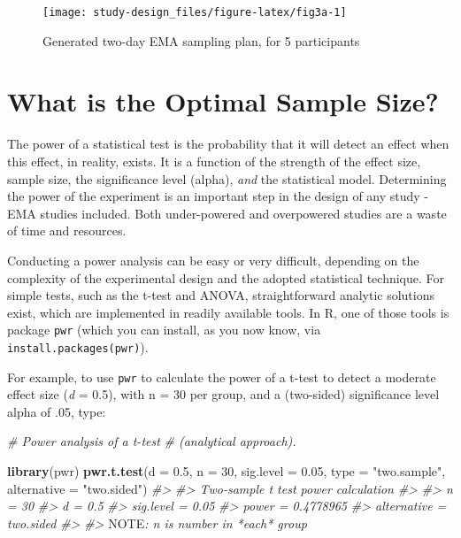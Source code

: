 \documentclass[]{book}
\newenvironment{Shaded}{\begin{snugshade}}{\end{snugshade}}
\newcommand{\KeywordTok}[1]{\textcolor[rgb]{0.13,0.29,0.53}{\textbf{#1}}}
\newcommand{\DataTypeTok}[1]{\textcolor[rgb]{0.13,0.29,0.53}{#1}}
\newcommand{\DecValTok}[1]{\textcolor[rgb]{0.00,0.00,0.81}{#1}}
\newcommand{\FloatTok}[1]{\textcolor[rgb]{0.00,0.00,0.81}{#1}}
\newcommand{\StringTok}[1]{\textcolor[rgb]{0.31,0.60,0.02}{#1}}
\newcommand{\CommentTok}[1]{\textcolor[rgb]{0.56,0.35,0.01}{\textit{#1}}}
\newcommand{\AlertTok}[1]{\textcolor[rgb]{0.94,0.16,0.16}{#1}}
\newcommand{\NormalTok}[1]{#1}
\begin{document}
\begin{figure}

{\centering \texttt{[image: study-design\_files/figure-latex/fig3a-1]} 

}

\caption{Generated two-day EMA sampling plan, for 5 participants}\label{fig:fig3a}
\end{figure}

\section{What is the Optimal Sample
Size?}\label{what-is-the-optimal-sample-size}


The power of a statistical test is the probability that it will detect
an effect when this effect, in reality, exists. It is a function of the
strength of the effect size, sample size, the significance level
(alpha), \emph{and} the statistical model. Determining the power of the
experiment is an important step in the design of any study - EMA studies
included. Both under-powered and overpowered studies are a waste of time
and resources.

Conducting a power analysis can be easy or very difficult, depending on
the complexity of the experimental design and the adopted statistical
technique. For simple tests, such as the t-test and ANOVA,
straightforward analytic solutions exist, which are implemented in
readily available tools. In R, one of those tools is package
\texttt{pwr} (which you can install, as you now know, via
\texttt{install.packages(\textquotesingle{}pwr\textquotesingle{})}).

For example, to use \texttt{pwr} to calculate the power of a t-test to
detect a moderate effect size (\emph{d} = 0.5), with n = 30 per group,
and a (two-sided) significance level alpha of .05, type:

\begin{Shaded}
\begin{Highlighting}[]
\CommentTok{# Power analysis of a t-test}
\CommentTok{# (analytical approach).}

\KeywordTok{library}\NormalTok{(pwr)}
\KeywordTok{pwr.t.test}\NormalTok{(}\DataTypeTok{d =} \FloatTok{0.5}\NormalTok{, }
           \DataTypeTok{n =} \DecValTok{30}\NormalTok{,}
           \DataTypeTok{sig.level =} \FloatTok{0.05}\NormalTok{,}
           \DataTypeTok{type =} \StringTok{"two.sample"}\NormalTok{,}
           \DataTypeTok{alternative =} \StringTok{"two.sided"}\NormalTok{)}
\CommentTok{#> }
\CommentTok{#>      Two-sample t test power calculation }
\CommentTok{#> }
\CommentTok{#>               n = 30}
\CommentTok{#>               d = 0.5}
\CommentTok{#>       sig.level = 0.05}
\CommentTok{#>           power = 0.4778965}
\CommentTok{#>     alternative = two.sided}
\CommentTok{#> }
\CommentTok{#> }\AlertTok{NOTE}\CommentTok{: n is number in *each* group}
\end{Highlighting}
\end{Shaded}
\end{document}
